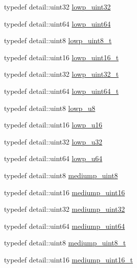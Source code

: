 \begin{DoxyCompactItemize}
typedef detail\-::uint32 \hyperlink{group__gtc__type__precision_gaf11e85af414720b4cd12bd57b3a81e68}{lowp\-\_\-uint32}
\item 
typedef detail\-::uint64 \hyperlink{group__gtc__type__precision_gacf666a9d9b309c4615c7a4f2ab0be289}{lowp\-\_\-uint64}
\item 
typedef detail\-::uint8 \hyperlink{group__gtc__type__precision_ga0910ef24195d1b8b26e34d73148c0c45}{lowp\-\_\-uint8\-\_\-t}
\item 
typedef detail\-::uint16 \hyperlink{group__gtc__type__precision_ga9a71176a4e5bc61951f9e9197d9c80e1}{lowp\-\_\-uint16\-\_\-t}
\item 
typedef detail\-::uint32 \hyperlink{group__gtc__type__precision_ga9f8cb602a358e1f48bda2682cf051f0c}{lowp\-\_\-uint32\-\_\-t}
\item 
typedef detail\-::uint64 \hyperlink{group__gtc__type__precision_gabf3069d4f188557a87b1d7f35eb0a270}{lowp\-\_\-uint64\-\_\-t}
\item 
typedef detail\-::uint8 \hyperlink{group__gtc__type__precision_gae63f942c49a30dbf266b2f13f3efe257}{lowp\-\_\-u8}
\item 
typedef detail\-::uint16 \hyperlink{group__gtc__type__precision_ga22c5364f27caa0a6eb0627cbc21e46be}{lowp\-\_\-u16}
\item 
typedef detail\-::uint32 \hyperlink{group__gtc__type__precision_gaba06fae1dd98ca50c017e68345df0365}{lowp\-\_\-u32}
\item 
typedef detail\-::uint64 \hyperlink{group__gtc__type__precision_ga61ed4c68a4cffb77cd63cc107119123a}{lowp\-\_\-u64}
\item 
typedef detail\-::uint8 \hyperlink{group__gtc__type__precision_gac4b849eaac0543a10f97f4bdda4850a8}{mediump\-\_\-uint8}
\item 
typedef detail\-::uint16 \hyperlink{group__gtc__type__precision_ga2cef3a0d7b0fce75c9885f64656d8933}{mediump\-\_\-uint16}
\item 
typedef detail\-::uint32 \hyperlink{group__gtc__type__precision_ga861dbd1051f488e425b3966001b568e5}{mediump\-\_\-uint32}
\item 
typedef detail\-::uint64 \hyperlink{group__gtc__type__precision_ga6685788d15d0a973ee7c2460d0456dc1}{mediump\-\_\-uint64}
\item 
typedef detail\-::uint8 \hyperlink{group__gtc__type__precision_gadfa38f3c245d371c4b2079f1fd68928b}{mediump\-\_\-uint8\-\_\-t}
\item 
typedef detail\-::uint16 \hyperlink{group__gtc__type__precision_ga0b385466deac5ac96061ef2cdd6db20f}{mediump\-\_\-uint16\-\_\-t}

\end{DoxyCompactItemize}
